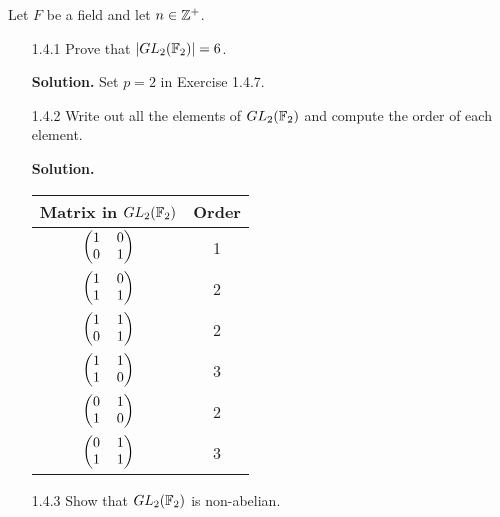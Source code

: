Let $F$ be a field and let $n \in \mathbb{Z}^+$.
\begin{enumerate}
   \item[1.4.1]   Prove that $|GL_2(\mathbb{F}_2)| = 6$.

      \textbf{Solution.} Set $p = 2$ in Exercise 1.4.7.
   \item[1.4.2]   Write out all the elements of $GL_2(\mathbb{F}_2)$ and compute the
                  order of each element.

      \textbf{Solution.}
      \begin{center}
         \begin{tabular}{@{}|c|c|@{}} \hline
            Matrix in $GL_2(\mathbb{F}_2)$           & Order  \\ \hline            
            $\left(\begin{tabular}{@{}cc@{}}
               1 & 0 \\
               0 & 1
            \end{tabular}\right)$            & 1      \\ \hline           
            $\left(\begin{tabular}{@{}cc@{}}
               1 & 0 \\
               1 & 1
            \end{tabular}\right)$            & 2      \\ \hline           
            $\left(\begin{tabular}{@{}cc@{}}
               1 & 1 \\
               0 & 1
            \end{tabular}\right)$            & 2      \\ \hline           
            $\left(\begin{tabular}{@{}cc@{}}
               1 & 1 \\
               1 & 0
            \end{tabular}\right)$            & 3      \\ \hline           
            $\left(\begin{tabular}{@{}cc@{}}
               0 & 1 \\
               1 & 0
            \end{tabular}\right)$            & 2      \\ \hline           
            $\left(\begin{tabular}{@{}cc@{}}
               0 & 1 \\
               1 & 1
            \end{tabular}\right)$            & 3      \\ \hline
         \end{tabular}
      \end{center}
   \item[1.4.3]   Show that $GL_2(\mathbb{F}_2)$ is non-abelian.


\end{enumerate}
